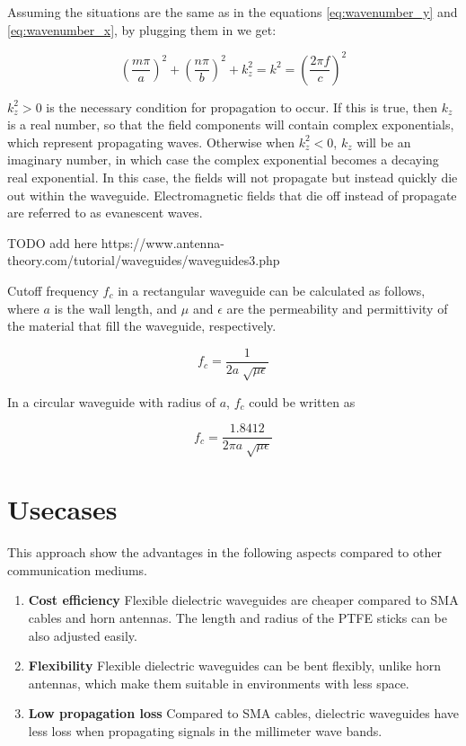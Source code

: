 \documentclass[a4paper,12pt]{report}
\begin{document}
Assuming the situations are the same as
in the equations \ref{eq:wavenumber_y} and \ref{eq:wavenumber_x},
by plugging them in we get:

\begin{equation}
  \left(\frac{m\pi}{a}\right)^2 + \left(\frac{n\pi}{b}\right)^2 + k_z^2 = k^2 = \left(\frac{2\pi f}{c}\right)^2
\end{equation}

$k_z^2 > 0$ is the necessary condition for propagation to occur.
If this is true, then $k_z$ is a real number,
so that the field components will contain complex exponentials,
which represent propagating waves.
Otherwise when $k_z^2 < 0$,
$k_z$ will be an imaginary number,
in which case the complex exponential becomes a decaying real exponential.
In this case, the fields will not propagate but instead quickly die out within the waveguide.
Electromagnetic fields that die off instead of propagate are referred to as evanescent waves.

TODO add here https://www.antenna-theory.com/tutorial/waveguides/waveguides3.php

Cutoff frequency $f_c$ in a rectangular waveguide can be calculated as follows,
where $a$ is the wall length, and $\mu$ and $\epsilon$ are
the permeability and permittivity of the material
that fill the waveguide, respectively.

\begin{equation}
  f_c = \frac{1}{2a\sqrt[]{\mu\epsilon}}
\end{equation}

In a circular waveguide with radius of $a$,
$f_c$ could be written as

\begin{equation}
  f_c = \frac{1.8412}{2\pi a\sqrt[]{\mu\epsilon}}
\end{equation}

\section{Usecases}

This approach show the advantages in the following aspects compared to
other communication mediums.

\begin{enumerate}
  \item \textbf{Cost efficiency} Flexible
  dielectric waveguides are cheaper compared to SMA cables and horn antennas.
  The length and radius of the PTFE sticks can be also adjusted easily.
  \item \textbf{Flexibility} Flexible dielectric waveguides can be bent
  flexibly, unlike horn antennas, which make them suitable in environments
  with less space.
  \item \textbf{Low propagation loss} Compared to SMA cables, dielectric waveguides
  have less loss when propagating signals in the millimeter wave bands.
\end{enumerate}
\end{document}

